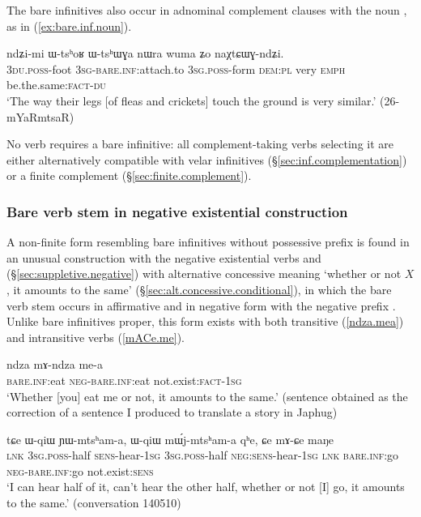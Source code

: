The bare infinitives also occur in adnominal complement clauses with the noun , as in (\ref{ex:bare.inf.noun}).

\begin{exe}
\ex \label{ex:bare.inf.noun}
\gll ndʑi-mi ɯ-tsʰoʁ ɯ-tsʰɯɣa nɯra wuma ʑo naχtɕɯɣ-ndʑi.   \\
\textsc{3du}.\textsc{poss}-foot \textsc{3sg}-\textsc{bare}.\textsc{inf:}attach.to \textsc{3sg}.\textsc{poss}-form \textsc{dem}:\textsc{pl} very \textsc{emph} be.the.same:\textsc{fact}-\textsc{du}  \\
\glt `The way their legs [of fleas and crickets] touch the ground is very similar.' (26-mYaRmtsaR)
\end{exe}

No verb requires a bare infinitive: all com\-ple\-ment-taking verbs selecting it are either alternatively compatible with velar infinitives (§\ref{sec:inf.complementation}) or a finite complement (§\ref{sec:finite.complement}).

\subsubsection{Bare verb stem in negative existential construction} \label{sec:bare.inf.negative} 
A non-finite form resembling bare infinitives without possessive prefix is found in an unusual construction with the negative existential verbs   and (§\ref{sec:suppletive.negative}) with alternative concessive meaning `whether or not $X$, it amounts to the same' (§\ref{sec:alt.concessive.conditional}), in which the bare verb stem occurs in affirmative and in negative form with the negative prefix . Unlike bare infinitives proper, this form exists with both transitive (\ref{ndza.mea}) and intransitive verbs (\ref{mACe.me}).

\begin{exe}
\ex \label{ndza.mea}
\gll ndza mɤ-ndza me-a \\
\textsc{bare}.\textsc{inf}:eat \textsc{neg}-\textsc{bare}.\textsc{inf}:eat not.exist:\textsc{fact}-\textsc{1sg} \\
\glt `Whether [you] eat me or not, it amounts to the same.' (sentence obtained as the correction of a sentence I produced to translate a story in Japhug)
\end{exe}

\begin{exe}
\ex \label{mACe.me}
\gll tɕe ɯ-qiɯ ɲɯ-mtsʰam-a, ɯ-qiɯ mɯ́j-mtsʰam-a qʰe, ɕe mɤ-ɕe maŋe   \\
\textsc{lnk} \textsc{3sg}.\textsc{poss}-half \textsc{sens}-hear-\textsc{1sg} \textsc{3sg}.\textsc{poss}-half \textsc{neg}:\textsc{sens}-hear-\textsc{1sg} \textsc{lnk} \textsc{bare}.\textsc{inf}:go \textsc{neg}-\textsc{bare}.\textsc{inf}:go not.exist:\textsc{sens} \\
\glt `I can hear half of it, can't hear the other half, whether or not [I] go, it amounts to the same.' (conversation 140510)
\end{exe}

